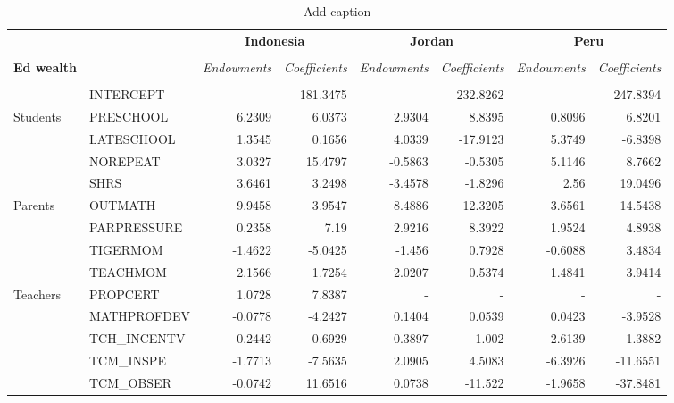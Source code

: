 \documentclass[10pt]{article}
\begin{document}
	
	\begin{table}[htbp]
		\footnotesize
		\def\arraystretch{1}
		\def\tabcolsep{4}
		\centering
		\caption{Add caption}
    \begin{tabular}{llrrrrrr}
    \toprule
     \midrule
          &       & \multicolumn{2}{c}{\textbf{Indonesia}} & \multicolumn{2}{c}{\textbf{Jordan}} & \multicolumn{2}{c}{\textbf{Peru}} \\
          \cline{3-8} \\
    \textbf{Ed wealth} &       & \multicolumn{1}{c}{\textit{Endowments}} & \multicolumn{1}{c}{\textit{Coefficients}} & \multicolumn{1}{c}{\textit{Endowments}} & \multicolumn{1}{c}{\textit{Coefficients}} & \multicolumn{1}{c}{\textit{Endowments}} & \multicolumn{1}{c}{\textit{Coefficients}} \\[0.4em]
    \cline{3-8} \\
    \textbf{} & INTERCEPT &       & 181.3475 &       & 232.8262 &       & 247.8394 \\[0.4em]
    Students & PRESCHOOL & 6.2309 & 6.0373 & 2.9304 & 8.8395 & 0.8096 & 6.8201 \\[0.4em]
          & LATESCHOOL & 1.3545 & 0.1656 & 4.0339 & -17.9123 & 5.3749 & -6.8398 \\[0.4em]
          & NOREPEAT & 3.0327 & 15.4797 & -0.5863 & -0.5305 & 5.1146 & 8.7662 \\[0.4em]
          & SHRS  & 3.6461 & 3.2498 & -3.4578 & -1.8296 & 2.56  & 19.0496 \\[0.4em]
    Parents & OUTMATH & 9.9458 & 3.9547 & 8.4886 & 12.3205 & 3.6561 & 14.5438 \\[0.4em]
          & PARPRESSURE  & 0.2358 & 7.19  & 2.9216 & 8.3922 & 1.9524 & 4.8938 \\[0.4em]
          & TIGERMOM & -1.4622 & -5.0425 & -1.456 & 0.7928 & -0.6088 & 3.4834 \\[0.4em]
          & TEACHMOM & 2.1566 & 1.7254 & 2.0207 & 0.5374 & 1.4841 & 3.9414 \\[0.4em]
    Teachers & PROPCERT & 1.0728 & 7.8387 & -     & -     & -     & - \\[0.4em]
          & MATHPROFDEV & -0.0778 & -4.2427 & 0.1404 & 0.0539 & 0.0423 & -3.9528 \\[0.4em]
          & TCH\_INCENTV & 0.2442 & 0.6929 & -0.3897 & 1.002 & 2.6139 & -1.3882 \\[0.4em]
          & TCM\_INSPE & -1.7713 & -7.5635 & 2.0905 & 4.5083 & -6.3926 & -11.6551 \\[0.4em]
          & TCM\_OBSER & -0.0742 & 11.6516 & 0.0738 & -11.522 & -1.9658 & -37.8481 \\[0.4em]

\end{tabular}
\end{table}
\end{document}
